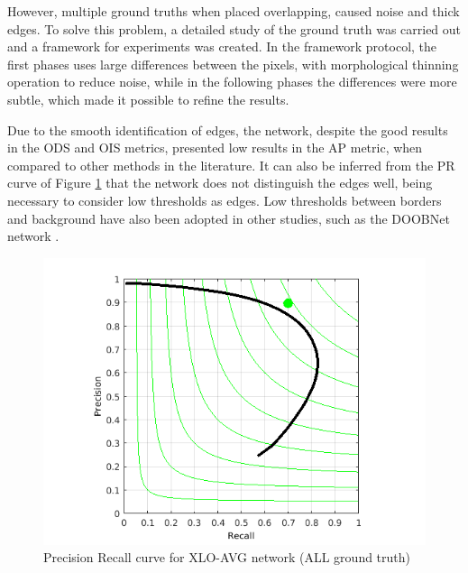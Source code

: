 However, multiple ground truths when placed overlapping, caused noise and thick edges.
To solve this problem, a detailed study of the ground truth was carried out and a framework for experiments was created.
In the framework protocol, the first phases uses large differences between the pixels, with morphological thinning operation to reduce noise, while in the following phases the differences were more subtle, which made it possible to refine the results.


Due to the smooth identification of edges, the network, despite the good results in the ODS and OIS metrics, presented low results in the AP metric, when compared to other methods in the literature.
It can also be inferred from the PR curve of Figure \ref{fig:bsds_xlo_avg_curve} that the network does not distinguish the edges well, being necessary to consider low thresholds as edges. 
Low thresholds between borders and background have also been adopted in other studies, such as the DOOBNet network \cite{Cumulative:Song20181847}.

\begin{figure}%
  \centering
  \includegraphics[width=0.9\columnwidth]{../imagens/graficos/cap6_xlo-avg.png}
  \caption{Precision Recall curve for XLO-AVG network (ALL ground truth)}
  \label{fig:bsds_xlo_avg_curve}
\end{figure}

